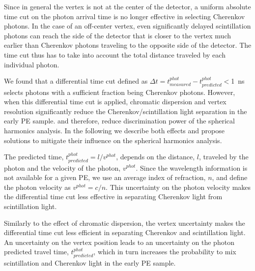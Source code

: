 Since in general the vertex is not at the center of the detector, a uniform absolute time cut on the photon arrival time is no longer 
effective in selecting Cherenkov photons. In the case of an off-center vertex, even significantly delayed scintillation photons can
reach the side of the detector that is closer to the vertex much earlier than Cherenkov photons traveling to the opposite side of the 
detector. The time cut thus has to take into account the total distance traveled by each individual photon.

We found that a differential time cut defined as $\Delta t=t^{phot}_{measured} - t^{phot}_{predicted}<$1~ns selects photons with a 
sufficient fraction being Cherenkov photons. However, when this differential time cut is applied, 
chromatic dispersion and vertex resolution significantly reduce the Cherenkov/scintillation light separation in the early PE sample.
and therefore, reduce discrimination power of the spherical harmonics analysis. In the following we describe both effects and 
propose solutions to mitigate their influence on the spherical harmonics analysis.

The predicted time, 
$t^{phot}_{predicted}=l/v^{phot}$, depends on the distance, $l$, traveled by the photon and the velocity of the photon, 
$v^{phot}$.  Since the wavelength information is not available for a given PE, we use an average index of refraction, $n$, 
and define the photon velocity as $v^{phot} = c/n$. This uncertainty on the photon velocity makes the differential time cut less 
effective in separating Cherenkov light from scintillation light. 



Similarly to the effect of chromatic 
dispersion, the vertex uncertainty makes the differential time cut less efficient in separating Cherenkov and scintillation light. 
An uncertainty on the vertex position leads to an uncertainty on the photon predicted travel time, $t^{phot}_{predicted}$, which in turn
increases the probability to mix scintillation and Cherenkov light in the early PE sample.

